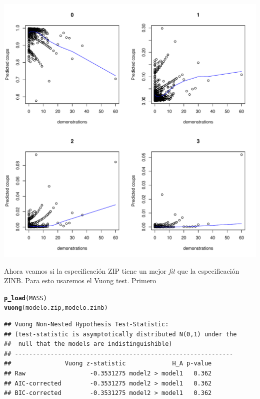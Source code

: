 \documentclass[onesided]{article}\usepackage[]{graphicx}\usepackage[]{color}
\makeatletter
\def\maxwidth{ %
  \ifdim\Gin@nat@width>\linewidth
    \linewidth
  \else
    \Gin@nat@width
  \fi
}
\newcommand{\hlstd}[1]{\textcolor[rgb]{0.345,0.345,0.345}{#1}}%
\newcommand{\hlkwd}[1]{\textcolor[rgb]{0.737,0.353,0.396}{\textbf{#1}}}%
\newenvironment{kframe}{%
 \def\at@end@of@kframe{}%
 \ifinner\ifhmode%
  \def\at@end@of@kframe{\end{minipage}}%
  \begin{minipage}{\columnwidth}%
 \fi\fi%
 \def\FrameCommand##1{\hskip\@totalleftmargin \hskip-\fboxsep
 \colorbox{shadecolor}{##1}\hskip-\fboxsep
     \hskip-\linewidth \hskip-\@totalleftmargin \hskip\columnwidth}%
 \MakeFramed {\advance\hsize-\width
   \@totalleftmargin\z@ \linewidth\hsize
   \@setminipage}}%
 {\par\unskip\endMakeFramed%
 \at@end@of@kframe}
\newenvironment{knitrout}{}{} %
\makeatother
\begin{document}
{\centering \includegraphics[width=\maxwidth]{figure/pp:plot-1} 

}




Ahora veamos si la especificaci\'on ZIP tiene un mejor \emph{fit} que la especificaci\'on ZINB. Para esto usaremos el Vuong test. Primero

\begin{knitrout}
\color{fgcolor}\begin{kframe}
\begin{alltt}
\hlkwd{p_load}\hlstd{(MASS)}
\hlkwd{vuong}\hlstd{(modelo.zip, modelo.zinb)}
\end{alltt}
\begin{verbatim}
## Vuong Non-Nested Hypothesis Test-Statistic: 
## (test-statistic is asymptotically distributed N(0,1) under the
##  null that the models are indistinguishible)
## -------------------------------------------------------------
##               Vuong z-statistic             H_A p-value
## Raw                  -0.3531275 model2 > model1   0.362
## AIC-corrected        -0.3531275 model2 > model1   0.362
## BIC-corrected        -0.3531275 model2 > model1   0.362
\end{verbatim}
\end{kframe}
\end{knitrout}
\end{document}
